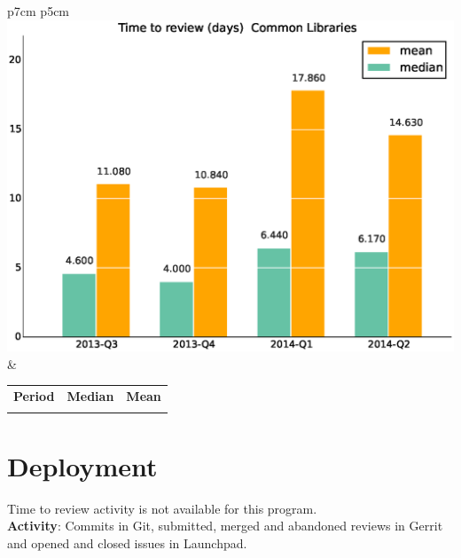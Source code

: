 \documentclass[a4wide,11pt]{report}
\begin{document}
\begin{tabular}{p{7cm} p{5cm}}
    \vspace{0pt} 
    \includegraphics[scale=.35]{figs/timetoreview_medianCommonLibraries.eps}
    & 
    \vspace{0pt}
    \begin{tabular}{l|r|r|}%
    \bfseries Period & \bfseries Median & \bfseries Mean %
    \csvreader[head to column names]{data/timetoreview_medianCommonLibraries.csv}{}%
    {\\ & \mediantime & \meantime}
    \end{tabular}
\end{tabular}

\newpage
\section{Deployment}

Time to review activity is not available for this program.\\

\textbf{Activity}: Commits in Git, submitted, merged and abandoned reviews in Gerrit and opened and closed issues in Launchpad.
\end{document}
